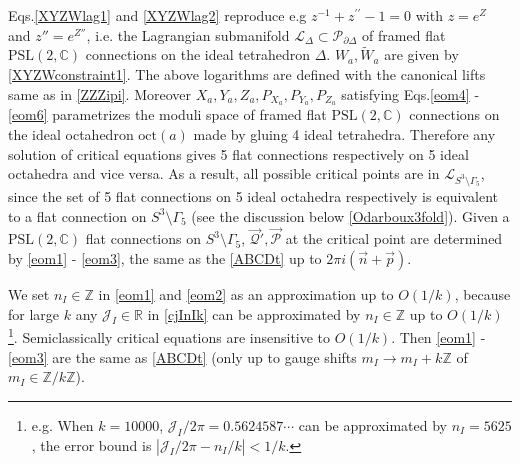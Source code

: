 \documentclass[aps,prd,notitlepage,nofootinbib,superscriptaddress,groupedaddress,twocolumn]{revtex4-1}
\def\R{\mathbb{R}}
\newcommand{\PSlc}{\mathrm{PSL}(2,\mathbb{C})}
\def\be{\begin{eqnarray}}
\def\ee{\end{eqnarray}}
\newcommand{\cj}{\mathcal J}
\newcommand{\cl}{\mathcal L}
\newcommand{\calp}{\mathcal P}
\newcommand{\scrp}{\mathscr{P}}
\newcommand{\scrq}{\mathscr{Q}}
\newcommand{\G}{\Gamma}
\begin{document}
Eqs.\eqref{XYZWlag1} and \eqref{XYZWlag2} reproduce e.g $z^{-1}+z^{\prime \prime}-1=0$ with $z=e^Z$ and $z''=e^{Z''}$, i.e. the Lagrangian submanifold $\cl_\Delta\subset \calp_{\partial\Delta}$ of framed flat $\PSlc$ connections on the ideal tetrahedron $\Delta$. $W_a,\widetilde{W}_a$ are given by \eqref{XYZWconstraint1}. The above logarithms are defined with the canonical lifts same as in \eqref{ZZZipi}. Moreover $X_a,Y_a,Z_a,P_{X_a},P_{Y_a},P_{Z_a}$ satisfying Eqs.\eqref{eom4} - \eqref{eom6} parametrizes the moduli space of framed flat $\PSlc$ connections on the ideal octahedron $\mathrm{oct}(a)$ made by gluing 4 ideal tetrahedra. Therefore any solution of critical equations gives 5 flat connections respectively on 5 ideal octahedra and vice versa. As a result, all possible critical points are in $\cl_{S^3\setminus \G_5}$, since the set of 5 flat connections on 5 ideal octahedra respectively is equivalent to a flat connection on $S^3\setminus\G_5$ (see the discussion below \eqref{Odarboux3fold}). Given a $\PSlc$ flat connections on $S^3\setminus\G_5$, $\vec{\scrq}',\vec{\scrp}$ at the critical point are determined by \eqref{eom1} - \eqref{eom3}, the same as the \eqref{ABCDt} up to $2\pi i(\vec{n}+\vec{p})$. 





We set $n_I\in\mathbb{Z}$ in \eqref{eom1} and \eqref{eom2} as an approximation up to $O(1/k)$, because for large $k$ any $\cj_I\in \R$ in \eqref{cjInIk} can be approximated by $n_I\in \mathbb{Z}$ up to $O(1/k)$ \footnote{e.g. When $k=10000$, $\cj_I/2\pi=0.5624587\cdots$ can be approximated by $n_I=5625$, the error bound is $|\cj_I/2\pi-n_I/k|<1/k$. }. Semiclassically critical equations are insensitive to $O(1/k)$. Then \eqref{eom1} - \eqref{eom3} are the same as \eqref{ABCDt} (only up to gauge shifts $m_I\to m_I+k\mathbb{Z}$ of $m_I\in\mathbb{Z}/k\mathbb{Z}$).
\end{document}
